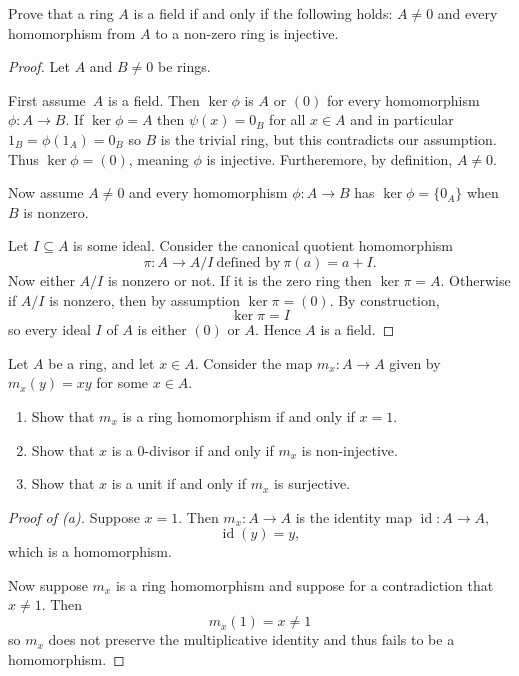 \documentclass[11pt]{article}
\begin{document}
\begin{prob}
    Prove that a ring $A$ is a field if and only if 
    the following holds: $A \neq 0$ and every homomorphism 
    from $A$ to a non-zero ring is injective. 
\end{prob}
\begin{proof}
    Let $A$ and $B \neq 0$ be rings. 

    First assume $A$ is a field. 
    Then $\ker \phi$ is $A$ or $(0)$ for every homomorphism 
    $\phi : A \to B$. If $\ker \phi = A$ then 
    $\psi(x) = 0_B$ for all $x \in A$ and in particular 
    $1_B = \phi(1_A) = 0_B$ so $B$ is the trivial ring, but 
    this contradicts our assumption. Thus 
    $\ker \phi = (0)$, meaning $\phi$ is injective. Furtheremore, 
    by definition, $A \neq 0$.
    
    Now assume $A \neq 0$ and every homomorphism 
    $\phi : A \to B$ has $\ker \phi = \{0_A\}$ when $B$ is nonzero. 

    Let $I \subseteq A$ is some ideal. Consider the canonical 
    quotient homomorphism 
    \[
        \pi : A \to A/I \ \text{defined by} \ 
        \pi(a) = a+I. 
    \]
    Now either $A/I$ is nonzero or not. If it is the zero ring 
    then $\ker \pi = A$. 
    Otherwise if $A/I$ is nonzero, then by assumption 
    $\ker \pi = (0)$. By construction, 
    \[
        \ker \pi = I
    \]
    so every ideal $I$ of $A$ is either $(0)$ or $A$. Hence 
    $A$ is a field. 
\end{proof}

\begin{prob}
    Let $A$ be a ring, and let $x \in A$. Consider 
    the map $m_x : A \to A$ given by $m_x(y) = xy$ for 
    some $x \in A$. 
    \begin{enumerate}[label=(\alph*)]
        \item Show that $m_x$ is a ring homomorphism if 
            and only if $x = 1$. 
        \item Show that $x$ is a $0$-divisor if and only if 
            $m_x$ is non-injective. 
        \item Show that $x$ is a unit if and only if $m_x$ 
            is surjective. 
    \end{enumerate}
\end{prob}
\begin{proof}[Proof of (a)]
    Suppose $x = 1$. Then $m_x : A \to A$ is the 
    identity map $\operatorname{id} : A \to A$, 
    \[
        \operatorname{id}(y) = y,  
    \]
    which is a homomorphism. 

    Now suppose $m_x$ is a ring homomorphism and suppose 
    for a contradiction that $x \neq 1$. 
    Then 
    \[
        m_x(1) = x \neq 1 
    \]
    so $m_x$ does not preserve the multiplicative 
    identity and thus fails to be a homomorphism. 
\end{proof}
\end{document}
